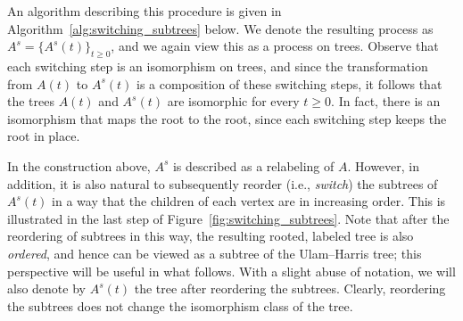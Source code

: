 \documentclass[11pt]{article}
\numberwithin{equation}{section}
\theoremstyle{definition}
\begin{document}
An algorithm describing this procedure is given in Algorithm~\ref{alg:switching_subtrees} below. 
We denote the resulting process as $A^{s} = \{ A^{s}(t) \}_{t \geq 0}$, 
and we again view this as a process on trees. 
Observe that each switching step is an isomorphism on trees, 
and since the transformation from $A(t)$ to $A^{s}(t)$ is a composition of these switching steps, 
it follows that 
the trees $A(t)$ and $A^{s}(t)$ are isomorphic for every $t \geq 0$. 
In fact, there is an isomorphism that maps the root to the root, since each switching step keeps the root in place. 


In the construction above, $A^{s}$ is described as a relabeling of $A$. 
However, in addition, it is also natural to subsequently reorder (i.e., \emph{switch}) the subtrees of $A^{s}(t)$ in a way that the children of each vertex are in increasing order. 
This is illustrated in the last step of Figure~\ref{fig:switching_subtrees}. 
Note that after the reordering of subtrees in this way, the resulting rooted, labeled tree is also \emph{ordered}, and hence can be viewed as a subtree of the Ulam--Harris tree; this perspective will be useful in what follows. 
With a slight abuse of notation, 
we will also denote by $A^{s}(t)$ the tree after reordering the subtrees. 
Clearly, reordering the subtrees does not change the isomorphism class of the tree. 

\end{document}
